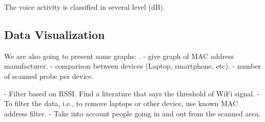 \documentclass{article}
\begin{document}
The voice activity is classified in several level (dB).

\subsection{Data Visualization} %
\label{sub:data_visualization}


We are also going to present some graphs: .
	- give graph of MAC address manufacturer.
	- comparison between devices (Laptop, smartphone, etc).
	- number of scanned probe per device.

- Filter based on RSSI. Find a literature that says the threshold of WiFi signal.
- To filter the data, i.e., to remove laptops or other device, use known MAC address filter.
- Take into account people going in and out from the scanned area.


% 
\end{document}
